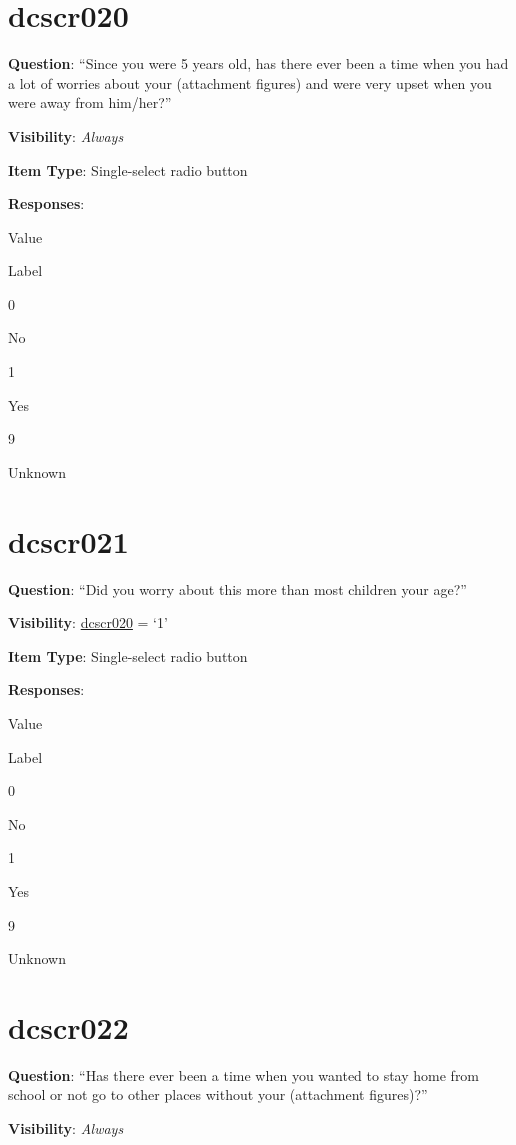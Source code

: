 \documentclass[]{book}
\begin{document}
\hypertarget{dcscr020}{%
\section{dcscr020}\label{dcscr020}}

\textbf{Question}: ``Since you were 5 years old, has there ever been a time when you had a lot of worries about your (attachment figures) and were very upset when you were away from him/her?''

\textbf{Visibility}: \emph{Always}

\textbf{Item Type}: Single-select radio button

\textbf{Responses}:

Value

Label

0

No

1

Yes

9

Unknown

\hypertarget{dcscr021}{%
\section{dcscr021}\label{dcscr021}}

\textbf{Question}: ``Did you worry about this more than most children your age?''

\textbf{Visibility}: \protect\hyperlink{dcscr020}{dcscr020} = `1'

\textbf{Item Type}: Single-select radio button

\textbf{Responses}:

Value

Label

0

No

1

Yes

9

Unknown

\hypertarget{dcscr022}{%
\section{dcscr022}\label{dcscr022}}

\textbf{Question}: ``Has there ever been a time when you wanted to stay home from school or not go to other places without your (attachment figures)?''

\textbf{Visibility}: \emph{Always}
\end{document}
